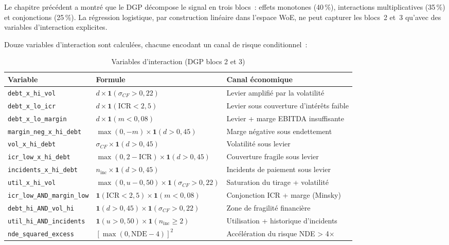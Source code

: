 \documentclass[12pt, a4paper, twoside, openright]{report}
\theoremstyle{definition}
\begin{document}
Le chapitre précédent a montré que le DGP décompose le signal en trois blocs~: effets monotones (40\,\%), interactions multiplicatives (35\,\%) et conjonctions (25\,\%). La régression logistique, par construction linéaire dans l'espace WoE, ne peut capturer les blocs~2 et~3 qu'avec des variables d'interaction explicites.

Douze variables d'interaction sont calculées, chacune encodant un canal de risque conditionnel~:

\begin{table}[htbp]
\centering
\caption{Variables d'interaction (DGP blocs 2 et 3)}
\label{tab:pd-interactions}
\small
\begin{tabular}{lll}
\toprule
Variable & Formule & Canal économique \\
\midrule
\texttt{debt\_x\_hi\_vol} & $d \times \mathbf{1}(\sigma_{CF} > 0{,}22)$ & Levier amplifié par la volatilité \\
\texttt{debt\_x\_lo\_icr} & $d \times \mathbf{1}(\text{ICR} < 2{,}5)$ & Levier sous couverture d'intérêts faible \\
\texttt{debt\_x\_lo\_margin} & $d \times \mathbf{1}(m < 0{,}08)$ & Levier + marge EBITDA insuffisante \\
\texttt{margin\_neg\_x\_hi\_debt} & $\max(0, -m) \times \mathbf{1}(d > 0{,}45)$ & Marge négative sous endettement \\
\texttt{vol\_x\_hi\_debt} & $\sigma_{CF} \times \mathbf{1}(d > 0{,}45)$ & Volatilité sous levier \\
\texttt{icr\_low\_x\_hi\_debt} & $\max(0, 2 - \text{ICR}) \times \mathbf{1}(d > 0{,}45)$ & Couverture fragile sous levier \\
\texttt{incidents\_x\_hi\_debt} & $n_{\text{inc}} \times \mathbf{1}(d > 0{,}45)$ & Incidents de paiement sous levier \\
\texttt{util\_x\_hi\_vol} & $\max(0, u - 0{,}50) \times \mathbf{1}(\sigma_{CF} > 0{,}22)$ & Saturation du tirage + volatilité \\
\texttt{icr\_low\_AND\_margin\_low} & $\mathbf{1}(\text{ICR} < 2{,}5) \times \mathbf{1}(m < 0{,}08)$ & Conjonction ICR + marge (Minsky) \\
\texttt{debt\_hi\_AND\_vol\_hi} & $\mathbf{1}(d > 0{,}45) \times \mathbf{1}(\sigma_{CF} > 0{,}22)$ & Zone de fragilité financière \\
\texttt{util\_hi\_AND\_incidents} & $\mathbf{1}(u > 0{,}50) \times \mathbf{1}(n_{\text{inc}} \geq 2)$ & Utilisation + historique d'incidents \\
\texttt{nde\_squared\_excess} & $[\max(0, \text{NDE} - 4)]^2$ & Accélération du risque NDE > 4$\times$ \\
\bottomrule
\end{tabular}
\end{table}
\end{document}
